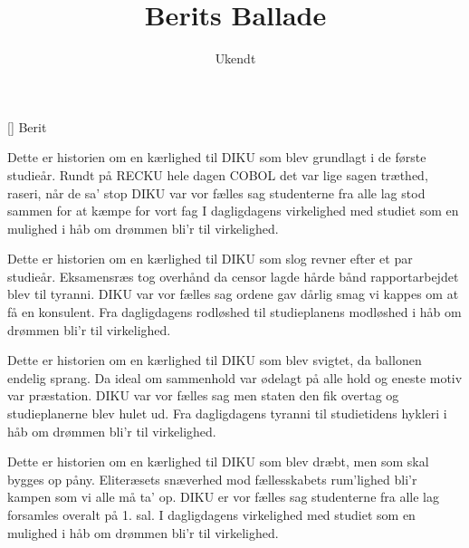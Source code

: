 \documentclass[a4paper,11pt]{article}
\title{Berits Ballade}
\author{Ukendt}
\begin{document}
\maketitle

\begin{roles}
[] Berit 
\end{roles}

\begin{song}
   Dette er historien om en kærlighed til DIKU
            som blev grundlagt i de første studieår.
            Rundt på RECKU hele dagen
            COBOL det var lige sagen
            træthed, raseri, når de sa' stop
            DIKU var vor fælles sag
            studenterne fra alle lag
            stod sammen for at kæmpe for vort fag
            I dagligdagens virkelighed
            med studiet som en mulighed
            i håb om drømmen bli'r til virkelighed.

   Dette er historien om en kærlighed til DIKU
            som slog revner efter et par studieår.
            Eksamensræs tog overhånd
            da censor lagde hårde bånd
            rapportarbejdet blev til tyranni.
            DIKU var vor fælles sag
            ordene gav dårlig smag
            vi kappes om at få en konsulent.
            Fra dagligdagens rodløshed
            til studieplanens modløshed
            i håb om drømmen bli'r til virkelighed.

   Dette er historien om en kærlighed til DIKU
            som blev svigtet, da ballonen endelig sprang.
            Da ideal om sammenhold
            var ødelagt på alle hold
            og eneste motiv var præstation.
            DIKU var vor fælles sag
            men staten den fik overtag
            og studieplanerne blev hulet ud.
            Fra dagligdagens tyranni
            til studietidens hykleri
            i håb om drømmen bli'r til virkelighed.

   Dette er historien om en kærlighed til DIKU
            som blev dræbt, men som skal bygges op påny.
            Eliteræsets snæverhed
            mod fællesskabets rum'lighed
            bli'r kampen som vi alle må ta' op.
            DIKU er vor fælles sag
            studenterne fra alle lag
            forsamles overalt på 1. sal.
            I dagligdagens virkelighed
            med studiet som en mulighed
            i håb om drømmen bli'r til virkelighed.
\end{song}
\end{document}
